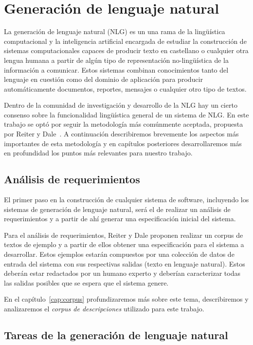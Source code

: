 \chapter{Generación de lenguaje natural}
\label{cap:nlg_intro}
La generación de lenguaje natural (NLG) es un una rama de la lingüística computacional y la inteligencia artificial encargada de estudiar la construcción de sistemas computacionales capaces de producir texto en castellano o cualquier otra lengua humana a partir de algún tipo de representación no-lingüística de la información a comunicar. Estos sistemas combinan conocimientos tanto del lenguaje en cuestión como del dominio de aplicación para producir automáticamente documentos, reportes, mensajes o cualquier otro tipo de textos.

Dentro de la comunidad de investigación y desarrollo de la NLG hay un cierto consenso sobre la funcionalidad lingüística general de un sistema de NLG.
En este trabajo se optó por seguir la metodología más comúnmente aceptada, propuesta por Reiter y Dale~\cite{reiter_dale}.
A continuación describiremos brevemente los aspectos más importantes de esta metodología y en capítulos posteriores desarrollaremos más en profundidad los puntos más relevantes para nuestro trabajo.

\section{Análisis de requerimientos}
El primer paso en la construcción de cualquier sistema de software, incluyendo los sistemas de generación de lenguaje natural, será el de realizar un análisis de requerimientos y a partir de ahí generar una especificación inicial del sistema. 

Para el análisis de requerimientos, Reiter y Dale proponen realizar un corpus de textos de ejemplo y a partir de ellos obtener una especificación para el sistema a desarrollar. Estos ejemplos estarán compuestos por una colección de datos de entrada del sistema con sus respectivas salidas (texto en lenguaje natural). Estos deberán estar redactados por un humano experto y deberían caracterizar todas las salidas posibles que se espera que el sistema genere.

En el capítulo~\ref{cap:corpus} profundizaremos más sobre este tema, describiremos y analizaremos el \emph{corpus de descripciones} utilizado para este trabajo.

\section{Tareas de la generación de lenguaje natural}

